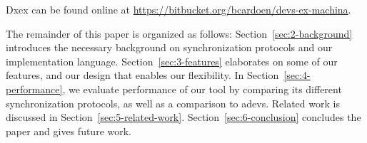 Dxex can be found online at \url{https://bitbucket.org/bcardoen/devs-ex-machina}.

The remainder of this paper is organized as follows:
Section~\ref{sec:2-background} introduces the necessary background on synchronization protocols and our implementation language.
Section~\ref{sec:3-features} elaborates on some of our features, and our design that enables our flexibility.
In Section~\ref{sec:4-performance}, we evaluate performance of our tool by comparing its different synchronization protocols, as well as a comparison to adevs.
Related work is discussed in Section~\ref{sec:5-related-work}.
Section~\ref{sec:6-conclusion} concludes the paper and gives future work.
